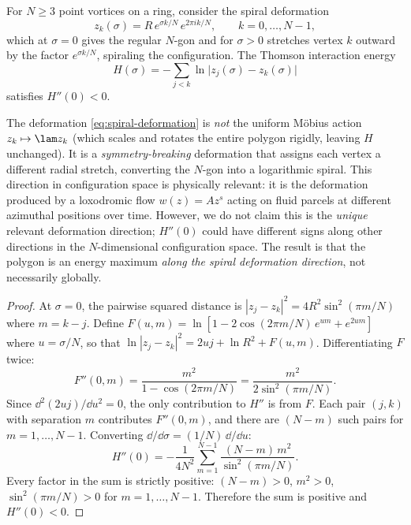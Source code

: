 \begin{proposition}\label{prop:energy-max}
For $N \ge 3$ point vortices on a ring, consider the spiral deformation
\begin{equation}\label{eq:spiral-deformation}
  z_k(\sigma) = R\,e^{\sigma k/N}\,e^{2\pi ik/N},
  \qquad k = 0, \ldots, N-1,
\end{equation}
which at $\sigma = 0$ gives the regular $N$-gon and for $\sigma > 0$
stretches vertex $k$ outward by the factor $e^{\sigma k/N}$, spiraling
the configuration.  The Thomson interaction energy
\begin{equation}\label{eq:H-sigma}
  H(\sigma) = -\sum_{j<k} \ln\bigl|z_j(\sigma) - z_k(\sigma)\bigr|
\end{equation}
satisfies $H''(0) < 0$.
\end{proposition}

\begin{remark}
The deformation \eqref{eq:spiral-deformation} is \emph{not} the uniform
M\"obius action $z_k \mapsto \lam z_k$ (which scales and rotates the
entire polygon rigidly, leaving $H$ unchanged).  It is a
\emph{symmetry-breaking} deformation that assigns each vertex a different
radial stretch, converting the $N$-gon into a logarithmic spiral.  This
direction in configuration space is physically relevant: it is the
deformation produced by a loxodromic flow $w(z) = Az^s$ acting on fluid
parcels at different azimuthal positions over time.  However, we do not
claim this is the \emph{unique} relevant deformation direction; $H''(0)$
could have different signs along other directions in the $N$-dimensional
configuration space.  The result is that the polygon is an energy maximum
\emph{along the spiral deformation direction}, not necessarily globally.
\end{remark}

\begin{proof}
At $\sigma = 0$, the pairwise squared distance is
$|z_j - z_k|^2 = 4R^2\sin^2(\pi m/N)$ where $m = k - j$.
Define $F(u, m) = \ln[1 - 2\cos(2\pi m/N)\,e^{um} + e^{2um}]$ where
$u = \sigma/N$, so that $\ln|z_j - z_k|^2 = 2uj + \ln R^2 + F(u,m)$.
Differentiating $F$ twice:
\[
  F''(0, m) = \frac{m^2}{1 - \cos(2\pi m/N)}
  = \frac{m^2}{2\sin^2(\pi m/N)}.
\]
Since $\dd^2(2uj)/\dd u^2 = 0$, the only contribution to $H''$ is from $F$.
Each pair $(j,k)$ with separation $m$ contributes $F''(0,m)$, and there
are $(N - m)$ such pairs for $m = 1, \ldots, N-1$.  Converting
$\dd/\dd\sigma = (1/N)\,\dd/\dd u$:
\begin{equation}\label{eq:Hpp-formula}
  H''(0) = -\frac{1}{4N^2}\sum_{m=1}^{N-1}
  \frac{(N-m)\,m^2}{\sin^2(\pi m/N)}.
\end{equation}
Every factor in the sum is strictly positive: $(N-m) > 0$, $m^2 > 0$,
$\sin^2(\pi m/N) > 0$ for $m = 1, \ldots, N-1$.  Therefore the sum is
positive and $H''(0) < 0$.
\end{proof}

